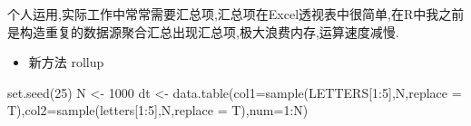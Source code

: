 \documentclass[
]{book}
\newenvironment{Shaded}{\begin{snugshade}}{\end{snugshade}}
\newcommand{\AttributeTok}[1]{\textcolor[rgb]{0.77,0.63,0.00}{#1}}
\newcommand{\DecValTok}[1]{\textcolor[rgb]{0.00,0.00,0.81}{#1}}
\newcommand{\FunctionTok}[1]{\textcolor[rgb]{0.00,0.00,0.00}{#1}}
\newcommand{\NormalTok}[1]{#1}
\newcommand{\OtherTok}[1]{\textcolor[rgb]{0.56,0.35,0.01}{#1}}
\newcommand{\SpecialCharTok}[1]{\textcolor[rgb]{0.00,0.00,0.00}{#1}}
\providecommand{\tightlist}{%
  \setlength{\itemsep}{0pt}\setlength{\parskip}{0pt}}
\begin{document}
个人运用,实际工作中常常需要汇总项,汇总项在Excel透视表中很简单,在R中我之前是构造重复的数据源聚合汇总出现汇总项,极大浪费内存,运算速度减慢.

\begin{itemize}
\tightlist
\item
  新方法 rollup
\end{itemize}

\begin{Shaded}
\begin{Highlighting}[]
\FunctionTok{set.seed}\NormalTok{(}\DecValTok{25}\NormalTok{)}
\NormalTok{N }\OtherTok{\textless{}{-}} \DecValTok{1000}
\NormalTok{dt }\OtherTok{\textless{}{-}} \FunctionTok{data.table}\NormalTok{(}\AttributeTok{col1=}\FunctionTok{sample}\NormalTok{(LETTERS[}\DecValTok{1}\SpecialCharTok{:}\DecValTok{5}\NormalTok{],N,}\AttributeTok{replace =}\NormalTok{ T),}\AttributeTok{col2=}\FunctionTok{sample}\NormalTok{(letters[}\DecValTok{1}\SpecialCharTok{:}\DecValTok{5}\NormalTok{],N,}\AttributeTok{replace =}\NormalTok{ T),}\AttributeTok{num=}\DecValTok{1}\SpecialCharTok{:}\NormalTok{N)}


\end{Highlighting}
\end{Shaded}
\end{document}
